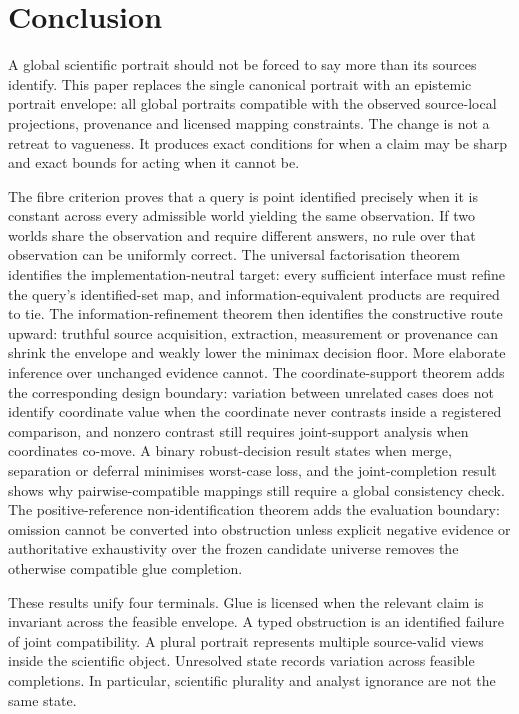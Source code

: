 \section{Conclusion}
\label{sec:conclusion}

A global scientific portrait should not be forced to say more than its sources
identify. This paper replaces the single canonical portrait with an epistemic
portrait envelope: all global portraits compatible with the observed
source-local projections, provenance and licensed mapping constraints. The
change is not a retreat to vagueness. It produces exact conditions for when a
claim may be sharp and exact bounds for acting when it cannot be.

The fibre criterion proves that a query is point identified precisely when it
is constant across every admissible world yielding the same observation. If
two worlds share the observation and require different answers, no rule over
that observation can be uniformly correct. The universal factorisation theorem
identifies the implementation-neutral target: every sufficient interface must
refine the query's identified-set map, and information-equivalent products are
required to tie. The information-refinement theorem then identifies the
constructive route upward: truthful source acquisition,
extraction, measurement or provenance can shrink the envelope and weakly lower
the minimax decision floor. More elaborate inference over unchanged evidence
cannot. The coordinate-support theorem adds the corresponding design boundary:
variation between unrelated cases does not identify coordinate value when the
coordinate never contrasts inside a registered comparison, and nonzero
contrast still requires joint-support analysis when coordinates co-move. A binary robust-decision result states when merge, separation or
deferral minimises worst-case loss, and the joint-completion result shows why
pairwise-compatible mappings still require a global consistency check. The
positive-reference non-identification theorem adds the evaluation boundary:
omission cannot be converted into obstruction unless explicit negative evidence
or authoritative exhaustivity over the frozen candidate universe removes the
otherwise compatible glue completion.

These results unify four terminals. Glue is licensed when the relevant claim
is invariant across the feasible envelope. A typed obstruction is an
identified failure of joint compatibility. A plural portrait represents
multiple source-valid views inside the scientific object. Unresolved state
records variation across feasible completions. In particular, scientific
plurality and analyst ignorance are not the same state.

